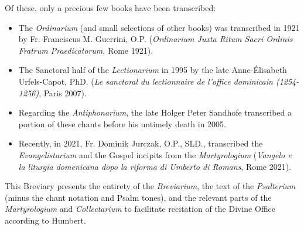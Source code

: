 Of these, only a precious few books have been transcribed:
\begin{itemize}[nosep]
	\item The \emph{Ordinarium} (and small selections of other books) was transcribed in 1921 by Fr. Franciscus M. Guerrini, O.P. (\emph{Ordinarium Juxta Ritum Sacri Ordinis Fratrum Praedicatorum}, Rome 1921).
	\item The Sanctoral half of the \emph{Lectionarium} in 1995 by the late Anne-Élisabeth Urfels-Capot, PhD. (\emph{Le sanctoral du lectionnaire de l'office dominicain (1254-1256)}, Paris 2007).
	\item Regarding the \emph{Antiphonarium}, the late Holger Peter Sandhofe transcribed a portion of these chants before his untimely death in 2005.
	\item Recently, in 2021, Fr. Dominik Jurczak, O.P., SLD., transcribed the \emph{Evangelistarium} and the Gospel incipits from the \emph{Martyrologium} (\emph{Vangelo e la liturgia domenicana dopo la riforma di Umberto di Romans}, Rome 2021).
\end{itemize}

This Breviary presents the entirety of the \emph{Breviarium}, the text of the \emph{Psalterium} (minus the chant notation and Psalm tones), and the relevant parts of the \emph{Martyrologium} and \emph{Collectarium} to facilitate recitation of the Divine Office according to Humbert.






